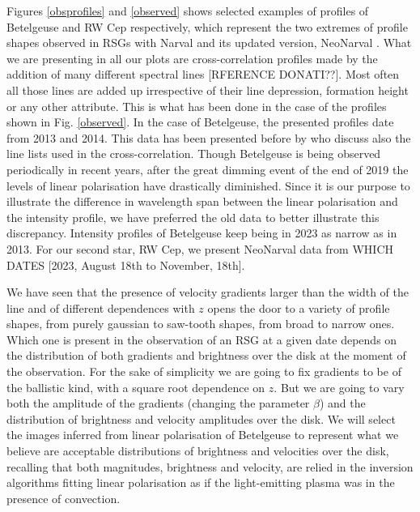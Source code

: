 \documentclass{/Users/art2/TeX/aanda/aa}
\begin{document}
Figures \ref{obsprofiles} and \ref{observed} shows selected examples of profiles of Betelgeuse and RW Cep respectively, which represent the two extremes of profile shapes 
observed in RSGs with Narval and its updated version, NeoNarval \cite[see][for a description of both instruments and the data reduction procedures]{lopez_ariste_three-dimensional_2022,Donati}.
What we are presenting in all our plots are cross-correlation profiles made by the addition of many different spectral lines  \citep{josselin_atmospheric_2007}[RFERENCE DONATI??]. Most 
often all those lines are added up irrespective of their line depression, formation height or any other 
attribute. This is what has been done in the case of the profiles shown in  Fig. \ref{observed}. In the case of Betelgeuse, the presented profiles date from 2013 and 2014. This data has been presented before by 
\cite{auriere_discovery_2016} who discuss also the line lists used in the cross-correlation. Though Betelgeuse is being observed periodically 
in recent years, after the great dimming event of the end of 2019 the levels of linear polarisation have drastically diminished. Since 
it is our purpose to illustrate the difference in wavelength span between the linear polarisation and the intensity profile, we have 
preferred the old data to better illustrate this discrepancy. Intensity profiles of Betelgeuse keep being in 2023 as narrow as in 2013. For our 
second star, RW Cep, we present NeoNarval data from 
WHICH DATES [2023, August 18th to November, 18th].  

We have seen that the presence of velocity gradients larger than the width of the line and of different dependences with $z$ opens the door to a 
variety of profile shapes, from purely gaussian to saw-tooth shapes, from broad to narrow ones. 
Which one is present in the observation 
of an RSG at a given date depends on the distribution of both gradients and brightness over the disk at the moment of the observation.
For the sake of simplicity we are going to fix gradients to be of the ballistic kind, with a square root dependence on $z$. But we are going 
to vary both the amplitude of the gradients (changing the parameter $\beta$) and the distribution of brightness and velocity amplitudes over 
the disk. We will select the images inferred from linear polarisation of Betelgeuse to represent what we believe are acceptable 
distributions of brightness and velocities over the disk, recalling that both magnitudes, brightness and velocity, are relied in the 
inversion algorithms fitting linear polarisation as if the light-emitting plasma was in the presence of convection. 
\end{document}
